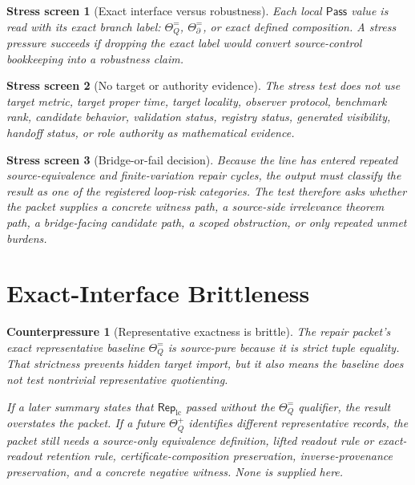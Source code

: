 \documentclass[11pt]{article}
\newcommand{\RepLC}{\mathsf{Rep}_{\mathrm{lc}}}
\newcommand{\Pass}{\mathsf{Pass}}
\newtheorem{stressscreen}{Stress screen}
\newtheorem{counterpressure}{Counterpressure}
\begin{document}
\begin{stressscreen}[Exact interface versus robustness]
Each local \(\Pass\) value is read with its exact branch label:
\(\Theta_Q^{=}\), \(\Theta_{\partial}^{=}\), or exact defined
composition. A stress pressure succeeds if dropping the exact label
would convert source-control bookkeeping into a robustness claim.
\end{stressscreen}

\begin{stressscreen}[No target or authority evidence]
The stress test does not use target metric, target proper time, target
locality, observer protocol, benchmark rank, candidate behavior,
validation status, registry status, generated visibility, handoff
status, or role authority as mathematical evidence.
\end{stressscreen}

\begin{stressscreen}[Bridge-or-fail decision]
Because the line has entered repeated source-equivalence and
finite-variation repair cycles, the output must classify the result as
one of the registered loop-risk categories. The test therefore asks
whether the packet supplies a concrete witness path, a source-side
irrelevance theorem path, a bridge-facing candidate path, a scoped
obstruction, or only repeated unmet burdens.
\end{stressscreen}

\section{Exact-Interface Brittleness}

\begin{counterpressure}[Representative exactness is brittle]
The repair packet's exact representative baseline
\(\Theta_Q^{=}\) is source-pure because it is strict tuple equality.
That strictness prevents hidden target import, but it also means the
baseline does not test nontrivial representative quotienting.

If a later summary states that \(\RepLC\) passed without the
\(\Theta_Q^{=}\) qualifier, the result overstates the packet. If a
future \(\Theta_Q^{+}\) identifies different representative records,
the packet still needs a source-only equivalence definition, lifted
readout rule or exact-readout retention rule, certificate-composition
preservation, inverse-provenance preservation, and a concrete negative
witness. None is supplied here.
\end{counterpressure}
\end{document}
